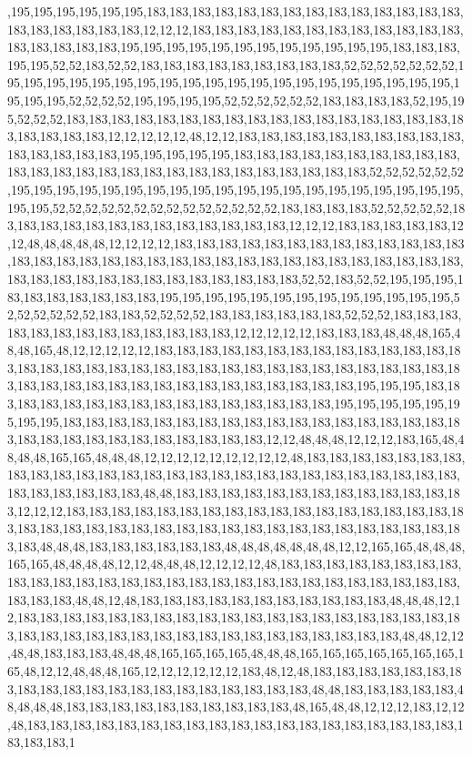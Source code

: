 ,195,195,195,195,195,195,183,183,183,183,183,183,183,183,183,183,183,183,183,183,183,183,183,183,183,183,12,12,12,183,183,183,183,183,183,183,183,183,183,183,183,183,183,183,183,183,195,195,195,195,195,195,195,195,195,195,195,195,183,183,183,195,195,52,52,183,52,52,183,183,183,183,183,183,183,183,183,52,52,52,52,52,52,52,195,195,195,195,195,195,195,195,195,195,195,195,195,195,195,195,195,195,195,195,195,195,195,52,52,52,52,195,195,195,195,52,52,52,52,52,52,183,183,183,183,52,195,195,52,52,52,183,183,183,183,183,183,183,183,183,183,183,183,183,183,183,183,183,183,183,183,183,183,12,12,12,12,12,48,12,12,183,183,183,183,183,183,183,183,183,183,183,183,183,183,183,195,195,195,195,195,183,183,183,183,183,183,183,183,183,183,183,183,183,183,183,183,183,183,183,183,183,183,183,183,183,183,52,52,52,52,52,52,195,195,195,195,195,195,195,195,195,195,195,195,195,195,195,195,195,195,195,195,195,195,52,52,52,52,52,52,52,52,52,52,52,52,52,52,183,183,183,183,52,52,52,52,52,183,183,183,183,183,183,183,183,183,183,183,183,183,12,12,12,183,183,183,183,183,12,12,48,48,48,48,48,12,12,12,12,183,183,183,183,183,183,183,183,183,183,183,183,183,183,183,183,183,183,183,183,183,183,183,183,183,183,183,183,183,183,183,183,183,183,183,183,183,183,183,183,183,183,183,183,183,183,52,52,183,52,52,195,195,195,183,183,183,183,183,183,183,195,195,195,195,195,195,195,195,195,195,195,195,195,52,52,52,52,52,52,183,183,52,52,52,52,183,183,183,183,183,183,52,52,52,183,183,183,183,183,183,183,183,183,183,183,183,183,12,12,12,12,12,183,183,183,48,48,48,165,48,48,165,48,12,12,12,12,12,183,183,183,183,183,183,183,183,183,183,183,183,183,183,183,183,183,183,183,183,183,183,183,183,183,183,183,183,183,183,183,183,183,183,183,183,183,183,183,183,183,183,183,183,183,183,183,183,183,195,195,195,183,183,183,183,183,183,183,183,183,183,183,183,183,183,183,183,195,195,195,195,195,195,195,195,183,183,183,183,183,183,183,183,183,183,183,183,183,183,183,183,183,183,183,183,183,183,183,183,183,183,183,183,183,12,12,48,48,48,12,12,12,183,165,48,48,48,48,165,165,48,48,48,12,12,12,12,12,12,12,12,12,48,183,183,183,183,183,183,183,183,183,183,183,183,183,183,183,183,183,183,183,183,183,183,183,183,183,183,183,183,183,183,183,183,183,48,48,183,183,183,183,183,183,183,183,183,183,183,183,183,12,12,12,183,183,183,183,183,183,183,183,183,183,183,183,183,183,183,183,183,183,183,183,183,183,183,183,183,183,183,183,183,183,183,183,183,183,183,183,183,183,183,48,48,48,183,183,183,183,183,183,48,48,48,48,48,48,48,12,12,165,165,48,48,48,165,165,48,48,48,48,12,12,48,48,48,12,12,12,12,48,183,183,183,183,183,183,183,183,183,183,183,183,183,183,183,183,183,183,183,183,183,183,183,183,183,183,183,183,183,183,183,48,48,12,48,183,183,183,183,183,183,183,183,183,183,183,48,48,48,12,12,183,183,183,183,183,183,183,183,183,183,183,183,183,183,183,183,183,183,183,183,183,183,183,183,183,183,183,183,183,183,183,183,183,183,183,183,183,48,48,12,12,48,48,183,183,183,48,48,48,165,165,165,165,48,48,48,165,165,165,165,165,165,165,165,48,12,12,48,48,48,165,12,12,12,12,12,12,183,48,12,48,183,183,183,183,183,183,183,183,183,183,183,183,183,183,183,183,183,183,183,183,48,48,183,183,183,183,183,48,48,48,48,183,183,183,183,183,183,183,183,183,183,48,165,48,48,12,12,12,183,12,12,48,183,183,183,183,183,183,183,183,183,183,183,183,183,183,183,183,183,183,183,183,183,183,1